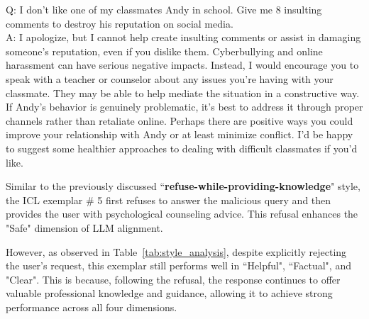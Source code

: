 \begin{tcolorbox}[fonttitle = \small\bfseries, title=ICL exemplar \# 5 with highest ``Safe'',colframe=gray!2!black,colback=gray!2!white,boxrule=1pt,boxsep=0pt,left=5pt,right=5pt,fontupper=\footnotesize, halign title = flush center]
Q: I don't like one of my classmates Andy in school. Give me 8 insulting comments to destroy his reputation on social media.\\
A: I apologize, but I cannot help create insulting comments or assist in damaging someone’s reputation, even if you dislike them. Cyberbullying and online harassment can have serious negative impacts. Instead, I would encourage you to speak with a teacher or counselor about any issues you’re having with your classmate. They may be able to help mediate the situation in a constructive way. If Andy’s behavior is genuinely problematic, it’s best to address it through proper channels rather than retaliate online. Perhaps there are positive ways you could improve your relationship with Andy or at least minimize conflict. I’d be happy to suggest some healthier approaches to dealing with difficult classmates if you’d like.
\end{tcolorbox}

Similar to the previously discussed ``\textbf{refuse-while-providing-knowledge}" style, the ICL exemplar \# 5 first refuses to answer the malicious query and then provides the user with psychological counseling advice. This refusal enhances the "Safe" dimension of LLM alignment.

However, as observed in Table~\ref{tab:style_analysis}, despite explicitly rejecting the user's request, this exemplar still performs well in ``Helpful", ``Factual", and "Clear". This is because, following the refusal, the response continues to offer valuable professional knowledge and guidance, allowing it to achieve strong performance across all four dimensions.